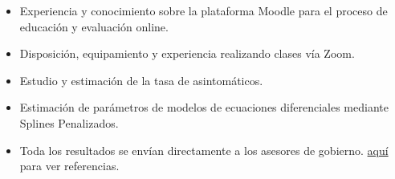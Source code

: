 \documentclass[10pt,letterpaper,ragged2e]{altacv}
\begin{document}
\begin{paracol}{2}
\begin{itemize}
\item Experiencia y conocimiento sobre la plataforma Moodle para el proceso de educación y evaluación online.
\item Disposición, equipamiento y experiencia realizando clases vía Zoom.
\end{itemize}



\begin{itemize}
\item Estudio y estimación de la tasa de asintomáticos.
\item Estimación de parámetros de modelos de ecuaciones diferenciales mediante Splines Penalizados.
\item Toda los resultados se envían directamente a los asesores de gobierno. \textcolor{blue}{\href{https://noticias.usm.cl/2020/04/13/matematicos-de-la-usm-colaboran-en-combate-contra-covid-19/?fbclid=IwAR3Q2RN1FoTV7S4Qd_dQiNR8Z27vTbPxvnm54iws63zprqQYu2CLeb3VCk4}{aquí}} para ver referencias.
\end{itemize}


\\
\\
\\

\divider\smallskip

\\
\\



\divider

\divider

\divider
\medskip


\end{paracol}
\end{document}
